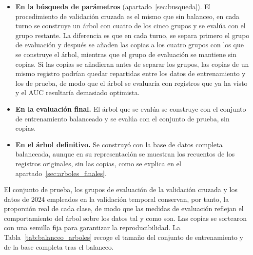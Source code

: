 \documentclass[twoside,a4paper,12pt,onecolumn,openany]{book}
\begin{document}
\begin{itemize}
    \item \textbf{En la búsqueda de parámetros} (apartado~\ref{sec:busqueda}). El procedimiento de validación cruzada es el mismo que sin balanceo, en cada turno se construye un árbol con cuatro de los cinco grupos y se evalúa con el grupo restante. La diferencia es que en cada turno, se separa primero el grupo de evaluación y después se añaden las copias a los cuatro grupos con los que se construye el árbol, mientras que el grupo de evaluación se mantiene sin copias. Si las copias se añadieran antes de separar los grupos, las copias de un mismo registro podrían quedar repartidas entre los datos de entrenamiento y los de prueba, de modo que el árbol se evaluaría con registros que ya ha visto y el AUC resultaría demasiado optimista.
    
    \item \textbf{En la evaluación final.} El árbol que se evalúa se construye con el conjunto de entrenamiento balanceado y se evalúa con el conjunto de prueba, sin copias.
    
    \item \textbf{En el árbol definitivo.} Se construyó con la base de datos completa balanceada, aunque en su representación se muestran los recuentos de los registros originales, sin las copias, como se explica en el apartado~\ref{sec:arboles_finales}.
\end{itemize}
 
El conjunto de prueba, los grupos de evaluación de la validación cruzada y los datos de 2024 empleados en la validación temporal conservan, por tanto, la proporción real de cada clase, de modo que las medidas de evaluación reflejan el comportamiento del árbol sobre los datos tal y como son. Las copias se sortearon con una semilla fija para garantizar la reproducibilidad. La Tabla~\ref{tab:balanceo_arboles} recoge el tamaño del conjunto de entrenamiento y de la base completa tras el balanceo.
 
\end{document}
